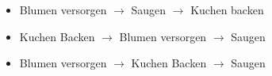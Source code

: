 \documentclass[a4paper,draft=false,oneside,12pt,ngerman]{scrreprt}
\begin{document}
\begin{itemize}
    \item Blumen versorgen $\rightarrow$ Saugen $\rightarrow$ Kuchen backen
    \item Kuchen Backen $\rightarrow$ Blumen versorgen $\rightarrow$ Saugen
    \item Blumen versorgen $\rightarrow$ Kuchen Backen $\rightarrow$ Saugen
\end{itemize}


\cleardoublepage{}
\renewcommand*{\chapterpagestyle}{scrheadings}
\renewcommand*{\indexpagestyle}{scrheadings}
\end{document}
